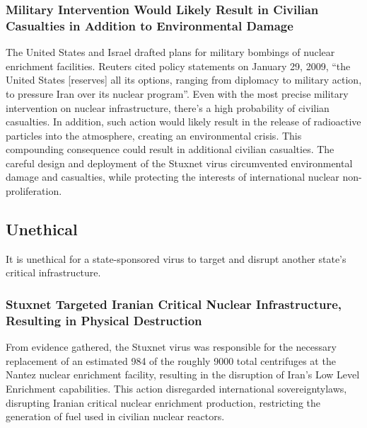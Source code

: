 \documentclass[12pt]{article}
\begin{document}
\begin{multicols}{2}
\subsubsection{Military Intervention Would Likely Result in Civilian Casualties in Addition to Environmental Damage}

The United States and Israel drafted plans for military bombings of nuclear enrichment facilities. Reuters cited policy statements on January 29, 2009, ``the United States [reserves] all its options, ranging from diplomacy to military action, to pressure Iran over its nuclear program''.\cite{usOptionsForIran} Even with the most precise military intervention on nuclear infrastructure, there's a high probability of civilian casualties. In addition, such action would likely result in the release of radioactive particles into the atmosphere, creating an environmental crisis. This compounding consequence could result in additional civilian casualties. The careful design and deployment of the Stuxnet virus circumvented environmental damage and casualties, while protecting the interests of international nuclear non-proliferation.

\subsection{Unethical}

It is unethical for a state-sponsored virus to target and disrupt another state's critical infrastructure.

\subsubsection{Stuxnet Targeted Iranian Critical Nuclear Infrastructure, Resulting in Physical Destruction}

From evidence gathered, the Stuxnet virus was responsible for the necessary replacement of an estimated 984 of the roughly 9000 total centrifuges at the Nantez nuclear enrichment facility, resulting in the disruption of Iran's Low Level Enrichment capabilities.\cite{lookIntoIranianNuclearProgram} This action disregarded international sovereignty\footnotemark[2]  laws, disrupting Iranian critical nuclear enrichment production, restricting the generation of fuel used in civilian nuclear reactors.\cite{internationalSovereigntyDefinition}



\end{multicols}
\end{document}
